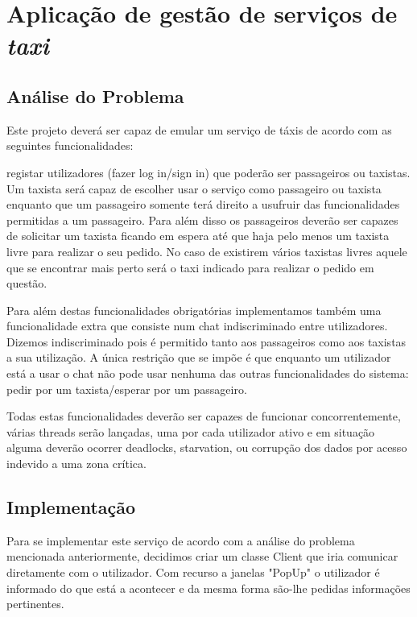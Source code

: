 \chapter{Aplicação de gestão de serviços de \emph{taxi}}

\section{Análise do Problema}

Este projeto deverá ser capaz de emular um serviço de táxis de acordo com as seguintes funcionalidades:

registar utilizadores (fazer log in/sign in) que poderão ser passageiros ou taxistas. Um taxista será capaz de escolher usar o serviço como passageiro ou taxista enquanto que um passageiro somente terá direito a usufruir das funcionalidades permitidas a um passageiro. Para além disso os passageiros deverão ser capazes de solicitar um taxista ficando em espera até que haja pelo menos um taxista livre para realizar o seu pedido. No caso de existirem vários taxistas livres aquele que se encontrar mais perto será o taxi indicado para realizar o pedido em questão.

Para além destas funcionalidades obrigatórias implementamos também uma funcionalidade extra que consiste num chat indiscriminado entre utilizadores. Dizemos indiscriminado pois é permitido tanto aos passageiros como aos taxistas a sua utilização. A única restrição que se impõe é que enquanto um utilizador está a usar o chat não pode usar nenhuma das outras funcionalidades do sistema: pedir por um taxista/esperar por um passageiro.

Todas estas funcionalidades deverão ser capazes de funcionar concorrentemente, várias threads serão lançadas, uma por cada utilizador ativo e em situação alguma deverão ocorrer deadlocks, starvation, ou corrupção dos dados por acesso indevido a uma zona crítica.





\section{Implementação}

Para se implementar este serviço de acordo com a análise do problema mencionada anteriormente, decidimos criar um classe Client que iria comunicar diretamente com o utilizador. Com recurso a janelas "PopUp" o utilizador é informado do que está a acontecer e da mesma forma são-lhe pedidas informações pertinentes.

